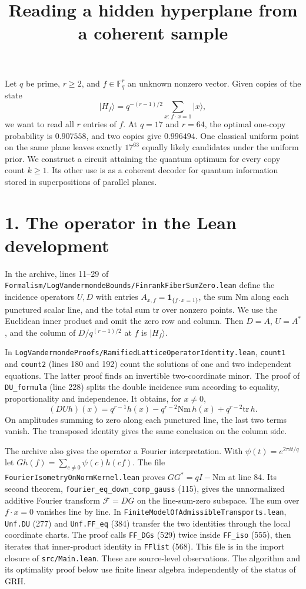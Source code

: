 \documentclass[11pt]{article}
\title{Reading a hidden hyperplane from a coherent sample}
\author{}\date{}
\newcommand{\F}{\mathbb F_q}
\newcommand{\ket}[1]{\lvert #1\rangle}
\newcommand{\one}{\mathbf 1}
\newcommand{\file}[1]{{\small\nolinkurl{#1}}}
\begin{document}
\maketitle
\vspace{-3.2em}
Let $q$ be prime, $r\ge2$, and $f\in\F^r$ an unknown nonzero vector. Given
copies of the state
\[
  \ket{H_f}=q^{-(r-1)/2}\sum_{x:\,f\cdot x=1}\ket{x},
\]
we want to read all $r$ entries of $f$. At $q=17$ and $r=64$, the optimal
one-copy probability is $0.907558$, and two copies give $0.996494$.
One classical uniform point on the same plane leaves exactly $17^{63}$
equally likely candidates under the uniform prior. We construct a circuit
attaining the quantum optimum for every copy count $k\ge1$. Its other use is
as a coherent decoder for quantum information stored in superpositions
of parallel planes.

\section*{1. The operator in the Lean development}
In the archive, lines 11--29 of
\file{Formalism/LogVandermondeBounds/FinrankFiberSumZero.lean}
define the incidence operators $U,D$ with entries
$A_{x,f}=\one_{\{f\cdot x=1\}}$, the sum $\mathrm{Nm}$ along each punctured
scalar line, and the total sum $\mathrm{tr}$ over nonzero points. We use
the Euclidean inner product and omit the zero row and column. Then $D=A$,
$U=A^*$, and the column of $D/q^{(r-1)/2}$ at $f$ is $\ket{H_f}$.

In \file{LogVandermondeProofs/RamifiedLatticeOperatorIdentity.lean},
\file{count1} and \file{count2} (lines 180 and 192) count the solutions of one
and two independent equations. The latter proof finds an invertible
two-coordinate minor. The proof of \file{DU_formula} (line 228) splits the
double incidence sum according to equality, proportionality and independence.
It obtains, for $x\ne0$,
\[
  (DUh)(x)=q^{r-1}h(x)-q^{r-2}\mathrm{Nm}\,h(x)+q^{r-2}\mathrm{tr}\,h .
\]
On amplitudes summing to zero along each punctured line, the last two terms
vanish. The transposed identity gives the same conclusion on the column side.

The archive also gives the operator a Fourier interpretation. With
$\psi(t)=e^{2\pi i t/q}$ let $Gh(f)=\sum_{c\ne0}\psi(c)h(cf)$.
The file \file{FourierIsometryOnNormKernel.lean} proves
$GG^*=qI-\mathrm{Nm}$ at line 84. Its second theorem,
\file{fourier_eq_down_comp_gauss} (115), gives the unnormalized
additive Fourier transform $\mathcal F=DG$ on the line-sum-zero subspace.
The sum over $f\cdot x=0$ vanishes line by line.
In \file{FiniteModelOfAdmissibleTransports.lean}, \file{Unf.DU} (277) and
\file{Unf.FF_eq} (384) transfer the two identities through the local
coordinate charts. The proof calls \file{FF_DGs} (529) twice inside
\file{FF_iso} (555), then iterates that inner-product identity in
\file{FFlist} (568). This file is in the import closure of \file{src/Main.lean}.
These are source-level observations. The algorithm and its optimality proof
below use finite linear algebra independently of the status of GRH.
\end{document}
